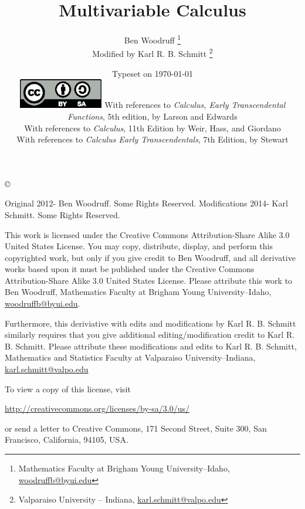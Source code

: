 \documentclass[letterpaper,oneside]{book}%
\newcommand{\thomaseeshort}[1]{#1}
\newcommand{\thomaseeshort}[1]{}
\newcommand{\larsonfiveshort}[1]{#1}
\newcommand{\larsonfiveshort}[1]{}
\newcommand{\stewartsshort}[1]{#1}
\newcommand{\stewartsshort}[1]{}
\theoremstyle{plain}
\theoremstyle{box}
\theoremstyle{problem}
\begin{document}
\frontmatter
\title{Multivariable Calculus}
\author{Ben Woodruff
				\thanks{Mathematics Faculty at Brigham Young University--Idaho, \url{woodruffb@byui.edu}}\\
				Modified by Karl R. B. Schmitt
				\thanks{Valparaiso University -- Indiana, \url{karl.schmitt@valpo.edu} }
				}
\date{Typeset on \today\\
	\vfill
	\includegraphics[height=1.3cm]{by-sa.eps}
	\vfill
	\larsonfiveshort{With references to \emph{Calculus, Early Transcendental Functions}, 5th edition, by Larson and Edwards\\}
	\thomaseeshort{With references to \emph{Calculus}, 11th Edition by Weir, Hass, and Giordano\\}
	\stewartsshort{With references to \emph{Calculus Early Transcendentals}, 7th Edition, by Stewart\\}
	}

\maketitle

\thispagestyle{empty}

\noindent\copyright{ Original 2012- Ben Woodruff.  Some Rights Reserved. Modifications 2014- Karl Schmitt. Some Rights Reserved.\\

\bigskip

\noindent This work is licensed under the Creative Commons Attribution-Share Alike 3.0 United States License.  You may copy, distribute, display, and perform this copyrighted work, but only if you give credit to Ben Woodruff, and all derivative works based upon it must be published under the Creative Commons Attribution-Share Alike 3.0 United States License. Please attribute this work to Ben Woodruff, Mathematics Faculty at Brigham Young University--Idaho, \url{woodruffb@byui.edu}. 

\noindent Furthermore, this deriviative with edits and modifications by Karl R. B. Schmitt similarly requires that you give additional editing/modification credit to Karl R. B. Schmitt. Please attribute these modifications and edits to Karl R. B. Schmitt, Mathematics and Statistics Faculty at Valparaiso University--Indiana, \url{karl.schmitt@valpo.edu}

To view a copy of this license, visit
\begin{center}
  \url{http://creativecommons.org/licenses/by-sa/3.0/us/}
\end{center}
or send a letter to Creative Commons, 171 Second Street, Suite 300, San Francisco, California, 94105, USA.}
\end{document}
